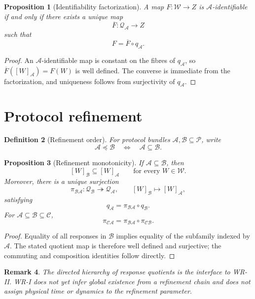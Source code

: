 \documentclass[11pt]{article}
\newtheorem{definition}{Definition}[section]
\newtheorem{proposition}[definition]{Proposition}
\newtheorem{remark}[definition]{Remark}
\newcommand{\W}{\mathcal W}
\newcommand{\Pcal}{\mathcal P}
\newcommand{\Acal}{\mathcal A}
\newcommand{\Bcal}{\mathcal B}
\newcommand{\QA}{\mathcal Q_{\mathcal A}}
\begin{document}
\begin{proposition}[Identifiability factorization]\label{prop:identifiable}
A map $F:\W\to Z$ is $\Acal$-identifiable if and only if there exists a unique
map
\[
\overline F:\QA\to Z
\]
such that
\[
F=\overline F\circ q_{\Acal}.
\]
\end{proposition}

\begin{proof}
An $\Acal$-identifiable map is constant on the fibres of $q_{\Acal}$, so
$\overline F([W]_{\Acal})=F(W)$ is well defined. The converse is immediate from
the factorization, and uniqueness follows from surjectivity of $q_{\Acal}$.
\end{proof}

\section{Protocol refinement}

\begin{definition}[Refinement order]
For protocol bundles $\Acal,\Bcal\subseteq\Pcal$, write
\[
\Acal\preceq\Bcal
\quad\Longleftrightarrow\quad
\Acal\subseteq\Bcal.
\]
\end{definition}

\begin{proposition}[Refinement monotonicity]\label{prop:refinement}
If $\Acal\subseteq\Bcal$, then
\[
[W]_{\Bcal}\subseteq[W]_{\Acal}
\qquad\text{for every }W\in\W.
\]
Moreover, there is a unique surjection
\[
\pi_{\Bcal\Acal}:\mathcal Q_{\Bcal}\twoheadrightarrow\mathcal Q_{\Acal},
\qquad
[W]_{\Bcal}\mapsto[W]_{\Acal},
\]
satisfying
\[
q_{\Acal}=\pi_{\Bcal\Acal}\circ q_{\Bcal}.
\]
For $\Acal\subseteq\Bcal\subseteq\mathcal C$,
\[
\pi_{\mathcal C\Acal}
=
\pi_{\Bcal\Acal}\circ\pi_{\mathcal C\Bcal}.
\]
\end{proposition}

\begin{proof}
Equality of all responses in $\Bcal$ implies equality of the subfamily indexed
by $\Acal$. The stated quotient map is therefore well defined and surjective;
the commuting and composition identities follow directly.
\end{proof}

\begin{remark}
The directed hierarchy of response quotients is the interface to WR-II. WR-I
does not yet infer global existence from a refinement chain and does not assign
physical time or dynamics to the refinement parameter.
\end{remark}
\end{document}
